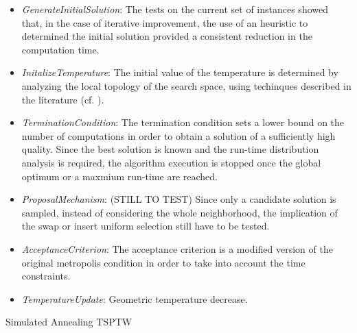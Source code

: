 \begin{homeworkProblem}
\begin{itemize}
  \item \emph{GenerateInitialSolution}: The tests on the current set of instances showed that, in the case of iterative improvement, the use of an heuristic to determined the initial solution provided a consistent reduction in the computation time.
  \item \emph{InitalizeTemperature}: The initial value of the temperature is determined by analyzing the local topology of the search space, using techinques described in the literature (cf. \cite{ohlmann2007compressed}).
  \item \emph{TerminationCondition}: The termination condition sets a lower bound on the number of computations in order to obtain a solution of a sufficiently high quality.
  Since the best solution is known and the run-time distribution analysis is required, the algorithm execution is stopped once the global optimum or a maxmium run-time are reached.
  \item \emph{ProposalMechanism}: (STILL TO TEST) Since only a candidate solution is sampled, instead of considering the whole neighborhood, the implication of the swap or insert uniform selection still have to be tested.
  \item \emph{AcceptanceCriterion}: The acceptance criterion is a modified version of the original metropolis condition in order to take into account the time constraints.
  \item \emph{TemperatureUpdate}: Geometric temperature decrease.
\end{itemize}


\begin{algorithm}
\caption{Simulated Annealing TSPTW}
\label{SA:TSPTW}
\begin{algorithmic}
\Procedure{SimulatedAnnealing}{$\alpha,\chi_0,l,t_{\max},f_{best},T_{c_{\min}$}    
  \Require Annealing schedule
  \State $s \gets$ \emph{InitialSolution}()
  \State $T \gets$ \emph{InitializeTemperature}($\chi_0$) 
  \While{!\emph{TerminationCondition}($s,t_{\max},f_{best}$)}
    \State $s' \gets$ \emph{ProposalMechanism()} 
    \If{\emph{UniformRandom}() $<$ \emph{AcceptanceCriterion}($s,s',T$)} 
      \State $s \gets s'$
    \EndIf
  \State $T \gets$ \emph{Update}($T$) 
\EndWhile
  \State \textbf{return} $s$
\EndProcedure
\end{algorithmic}
\end{algorithm}

\begin{center}
  

\end{center}
\end{homeworkProblem}
